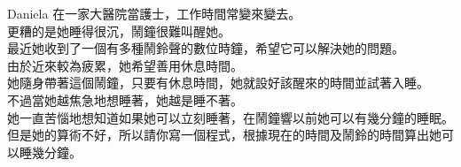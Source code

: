 Daniela 在一家大醫院當護士，工作時間常變來變去。\\
更糟的是她睡得很沉，鬧鐘很難叫醒她。\\
最近她收到了一個有多種鬧鈴聲的數位時鐘，希望它可以解決她的問題。\\
由於近來較為疲累，她希望善用休息時間。\\
她隨身帶著這個鬧鐘，只要有休息時間，她就設好該醒來的時間並試著入睡。\\
不過當她越焦急地想睡著，她越是睡不著。\\
她一直苦惱地想知道如果她可以立刻睡著，在鬧鐘響以前她可以有幾分鐘的睡眠。\\
但是她的算術不好，所以請你寫一個程式，根據現在的時間及鬧鈴的時間算出她可以睡幾分鐘。\\
